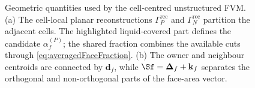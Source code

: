 \begin{figure}[t]
{%
    }
    \caption{Geometric quantities used by the cell-centred unstructured FVM.
    (a) The cell-local planar reconstructions $\Gamma_P^{\mathrm{rec}}$ and
    $\Gamma_N^{\mathrm{rec}}$ partition the adjacent cells.  The highlighted
    liquid-covered part defines the candidate $\alpha_f^{(P)}$; the shared
    fraction combines the available cuts through \cref{eq:averagedFaceFraction}.
    (b) The owner and neighbour centroids are connected
    by $\mathbf d_f$, while
    $\Sf=\boldsymbol{\Delta}_f+\mathbf k_f$ separates the orthogonal and
    non-orthogonal parts of the face-area vector.}
    \label{fig:unstructuredFVMSchematic}
\end{figure}
